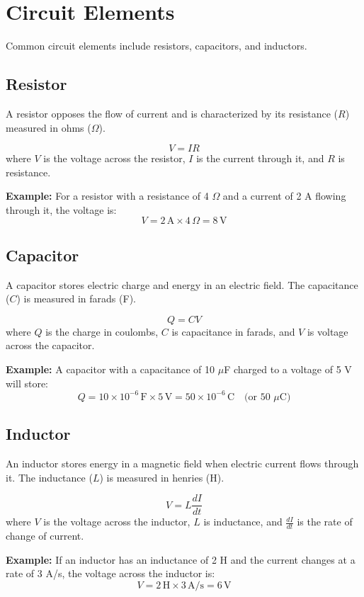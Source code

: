 \documentclass[openany]{book}
\begin{document}
\section{Circuit Elements}
Common circuit elements include resistors, capacitors, and inductors.

\subsection{Resistor}
A resistor opposes the flow of current and is characterized by its resistance ($R$) measured in ohms ($\Omega$).

\[
    V = IR
\]
where \(V\) is the voltage across the resistor, \(I\) is the current through it, and \(R\) is resistance.

\textbf{Example:} For a resistor with a resistance of 4 $\Omega$ and a current of 2 A flowing through it, the voltage is:
\[
    V = 2 \, \text{A} \times 4 \, \Omega = 8 \, \text{V}
\]

\subsection{Capacitor}
A capacitor stores electric charge and energy in an electric field. The capacitance ($C$) is measured in farads (F).

\[
    Q = CV
\]
where \(Q\) is the charge in coulombs, \(C\) is capacitance in farads, and \(V\) is voltage across the capacitor.

\textbf{Example:} A capacitor with a capacitance of 10 $\mu$F charged to a voltage of 5 V will store:
\[
    Q = 10 \times 10^{-6} \, \text{F} \times 5 \, \text{V} = 50 \times 10^{-6} \, \text{C} \quad \text{(or 50 {$\mu$}C)}
\]

\subsection{Inductor}
An inductor stores energy in a magnetic field when electric current flows through it. The inductance ($L$) is measured in henries (H).

\[
    V = L \frac{dI}{dt}
\]
where \(V\) is the voltage across the inductor, \(L\) is inductance, and \(\frac{dI}{dt}\) is the rate of change of current.

\textbf{Example:} If an inductor has an inductance of 2 H and the current changes at a rate of 3 A/s, the voltage across the inductor is:
\[
    V = 2 \, \text{H} \times 3 \, \text{A/s} = 6 \, \text{V}
\]
\end{document}
